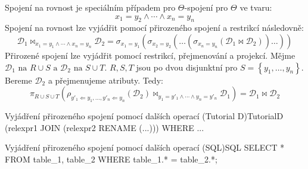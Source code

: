 Spojení na rovnost je speciálním případem pro $\Theta$-spojení pro $\Theta$ ve tvaru:
$$
x_{1} = y_{2} \land \cdots \land x_{n} = y_{n} 
$$
Spojení na rovnost lze vyjádřit pomocí přirozeného spojení a restrikcí následovně:
$$
\mathcal{D}_{1} \Join_{x_{1} = y_{1} \land \cdots \land x_{n} = y_{n}} \mathcal{D}_{2} = \sigma_{x_{1} = y_{1}} (\sigma_{x_{2} = y_{2}} (\ldots (\sigma_{x_{n} = y_{n}}(\mathcal{D}_{1} \Join \mathcal{D}_{2}))\dots))
$$
Přirozené spojení lze vyjádřit pomocí restrikcí, přejmenování a projekcí. Mějme $\mathcal{D}_{1}\text{ na } R \cup S \text{ a } \mathcal{D}_{2} \text{ na } S \cup T$. $R, S, T$ jsou po dvou disjunktní pro $S = \left\{ y_{1}, \ldots, y_{n} \right\}$. Bereme $\mathcal{D}_{2}$ a přejmenujeme atributy. Tedy:
$$
\pi_{R \cup S \cup T} (\rho_{y'_{1} \Leftarrow y_{1}, \ldots, y'_{n} \Leftarrow y_{n}} (\mathcal{D}_{2}) \Join_{y_{1} = y'_{1} \land \cdots \land y_{n} = y'_{n}} \mathcal{D}_{1}) = \mathcal{D}_{1} \Join \mathcal{D}_{2}
$$
\begin{upcode}{Vyjádření přirozeného spojení pomocí dalších operací (Tutorial D)}{}{TutorialD}
(relexpr1 JOIN (relexpr2 RENAME (...))) WHERE ...
\end{upcode}
\begin{upcode}{Vyjádření přirozeného spojení pomocí dalších operací (SQL)}{}{SQL}
SELECT * FROM table_1, table_2 WHERE table_1.* = table_2.*;
\end{upcode}